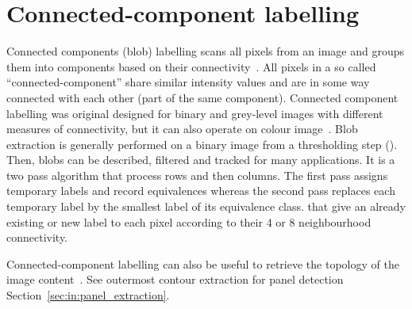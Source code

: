 \section{Connected-component labelling} %
\label{sec:ap:connected_component_labelling}
Connected components (blob) labelling scans all pixels from an image and groups them into components based on their connectivity~\cite{Szeliski2010Computer}.
All pixels in a so called ``connected-component'' share similar intensity values and are in some way connected with each other (part of the same component).
Connected component labelling was original designed for binary and grey-level images with different measures of connectivity, but it can also operate on colour image~\cite{dillencourt1992general}.
Blob extraction is generally performed on a binary image from a thresholding step ().
Then, blobs can be described, filtered and tracked for many applications.
It is a two pass algorithm that process rows and then columns.
The first pass assigns temporary labels and record equivalences whereas the second pass replaces each temporary label by the smallest label of its equivalence class. that give an already existing or new label to each pixel according to their 4 or 8 neighbourhood connectivity.

Connected-component labelling can also be useful to retrieve the topology of the image content~\cite{suzuki1985topological}.
See outermost contour extraction for panel detection Section~\ref{sec:in:panel_extraction}.






